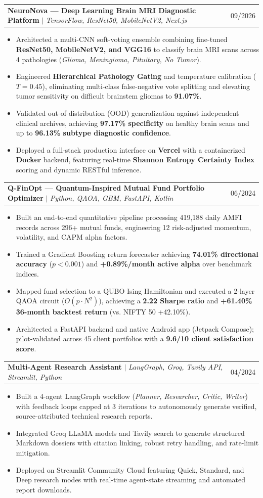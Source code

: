 \documentclass[letterpaper,10pt]{article}
\makeatletter
\newcommand{\resumeItem}[1]{
  \item\small{
    {#1 \vspace{-1.5pt}}
  }
}
\newcommand{\resumeProjectHeading}[2]{
    \vspace{-2pt}\item
    \begin{tabular*}{0.97\textwidth}{l@{\extracolsep{\fill}}r}
      \small#1 & #2 \\
    \end{tabular*}\vspace{-5pt}
}
\newcommand{\resumeItemListStart}{\begin{itemize}[leftmargin=0.15in]}
\newcommand{\resumeItemListEnd}{\end{itemize}\vspace{-4pt}}
\makeatother
\begin{document}
      \resumeProjectHeading
          {\textbf{NeuroNova — Deep Learning Brain MRI Diagnostic Platform} $|$ \emph{TensorFlow, ResNet50, MobileNetV2, Next.js}}{09/2026}
          \resumeItemListStart
            \resumeItem{Architected a multi-CNN soft-voting ensemble combining fine-tuned \textbf{ResNet50, MobileNetV2, and VGG16} to classify brain MRI scans across 4 pathologies (\textit{Glioma, Meningioma, Pituitary, No Tumor}).}
            \resumeItem{Engineered \textbf{Hierarchical Pathology Gating} and temperature calibration ($T=0.45$), eliminating multi-class false-negative vote splitting and elevating tumor sensitivity on difficult brainstem gliomas to \textbf{91.07\%}.}
            \resumeItem{Validated out-of-distribution (OOD) generalization against independent clinical archives, achieving \textbf{97.17\% specificity} on healthy brain scans and up to \textbf{96.13\% subtype diagnostic confidence}.}
            \resumeItem{Deployed a full-stack production interface on \textbf{Vercel} with a containerized \textbf{Docker} backend, featuring real-time \textbf{Shannon Entropy Certainty Index} scoring and dynamic RESTful inference.}
          \resumeItemListEnd

      \resumeProjectHeading
          {\textbf{Q-FinOpt — Quantum-Inspired Mutual Fund Portfolio Optimizer} $|$ \emph{Python, QAOA, GBM, FastAPI, Kotlin}}{06/2024}
          \resumeItemListStart
            \resumeItem{Built an end-to-end quantitative pipeline processing 419,188 daily AMFI records across 296+ mutual funds, engineering 12 risk-adjusted momentum, volatility, and CAPM alpha factors.}
            \resumeItem{Trained a Gradient Boosting return forecaster achieving \textbf{74.01\% directional accuracy} ($p < 0.001$) and \textbf{+0.89\%/month active alpha} over benchmark indices.}
            \resumeItem{Mapped fund selection to a QUBO Ising Hamiltonian and executed a 2-layer QAOA circuit ($O(p\cdot N^2)$), achieving a \textbf{2.22 Sharpe ratio} and \textbf{+61.40\% 36-month backtest return} (vs. NIFTY 50 +42.10\%).}
            \resumeItem{Architected a FastAPI backend and native Android app (Jetpack Compose); pilot-validated across 45 client portfolios with a \textbf{9.6/10 client satisfaction score}.}
          \resumeItemListEnd

      \resumeProjectHeading
          {\textbf{Multi-Agent Research Assistant} $|$ \emph{LangGraph, Groq, Tavily API, Streamlit, Python}}{04/2024}
          \resumeItemListStart
            \resumeItem{Built a 4-agent LangGraph workflow (\textit{Planner, Researcher, Critic, Writer}) with feedback loops capped at 3 iterations to autonomously generate verified, source-attributed technical research reports.}
            \resumeItem{Integrated Groq LLaMA models and Tavily search to generate structured Markdown dossiers with citation linking, robust retry handling, and rate-limit mitigation.}
            \resumeItem{Deployed on Streamlit Community Cloud featuring Quick, Standard, and Deep research modes with real-time agent-state streaming and automated report downloads.}
          \resumeItemListEnd
\end{document}
